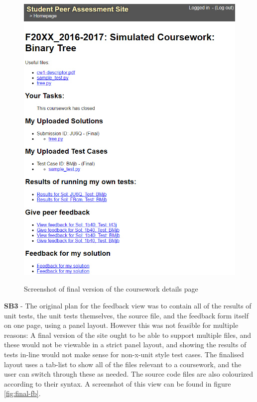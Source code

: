 \documentclass[a4paper,11pt]{report}
\begin{document}
\begin{figure}
\includegraphics[height=0.8\textheight]{storyboard/Final-cw.png}
\label{fig:final-cw}
\caption{Screenshot of final version of the coursework details page}
\end{figure}
\textbf{SB3} - The original plan for the feedback view was to contain all of the results of unit tests, the unit tests themselves, the source file, and the feedback form itself on one page, using a panel layout. However this was not feasible for multiple reasons: A final version of the site ought to be able to support multiple files, and these would not be viewable in a strict panel layout, and showing the results of tests in-line would not make sense for non-x-unit style test cases. The finalised layout uses a tab-list to show all of the files relevant to a coursework, and the user can switch through these as needed. The source code files are also colourized according to their syntax. A screenshot of this view can be found in figure \ref{fig:final-fb}.\par
\end{document}
